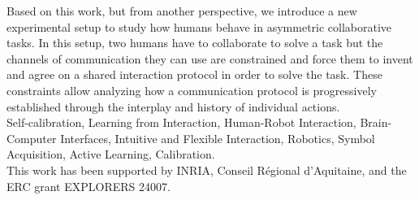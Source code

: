 \begin{vcenterpage}
Based on this work, but from another perspective, we introduce a new experimental setup to study how humans behave in asymmetric collaborative tasks. In this setup, two humans have to collaborate to solve a task but the channels of communication they can use are constrained and force them to invent and agree on a shared interaction protocol in order to solve the task. These constraints allow analyzing how a communication protocol is progressively established through the interplay and history of individual actions.\\

 Self-calibration, Learning from Interaction, Human-Robot Interaction, Brain-Computer Interfaces, Intuitive and Flexible Interaction, Robotics, Symbol Acquisition, Active Learning, Calibration.\\

This work has been supported by INRIA, Conseil R\'egional d'Aquitaine, and the ERC grant EXPLORERS 24007.

\end{vcenterpage}
